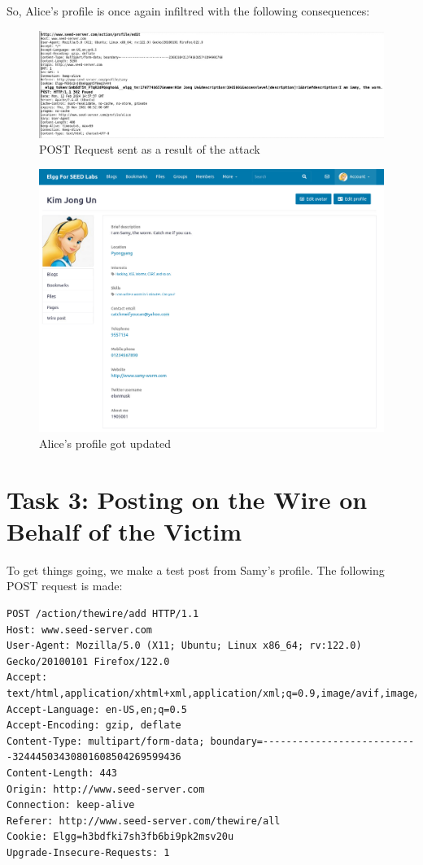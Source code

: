 \documentclass[12pt]{article}
\begin{document}
So, Alice's profile is once again infiltred with the following consequences:
     \begin{figure}[H]
         \centering
         \includegraphics[width=\textwidth]{Images/ss8.png}
         \caption{POST Request sent as a result of the attack}
         \label{fig:ss8}
     \end{figure}
     \begin{figure}[H]
         \centering
         \includegraphics[width=\textwidth]{Images/ss3.png}
         \caption{Alice's profile got updated}
         \label{fig:ss3}
     \end{figure}

\newpage


\section*{Task 3: Posting on the Wire on Behalf of the Victim}
To get things going, we make a test post from Samy's profile. The following POST request is made:

\begin{verbatim}
POST /action/thewire/add HTTP/1.1
Host: www.seed-server.com
User-Agent: Mozilla/5.0 (X11; Ubuntu; Linux x86_64; rv:122.0) Gecko/20100101 Firefox/122.0
Accept: text/html,application/xhtml+xml,application/xml;q=0.9,image/avif,image/webp,*/*;q=0.8
Accept-Language: en-US,en;q=0.5
Accept-Encoding: gzip, deflate
Content-Type: multipart/form-data; boundary=---------------------------32444503430801608504269599436
Content-Length: 443
Origin: http://www.seed-server.com
Connection: keep-alive
Referer: http://www.seed-server.com/thewire/all
Cookie: Elgg=h3bdfki7sh3fb6bi9pk2msv20u
Upgrade-Insecure-Requests: 1
\end{verbatim}
\end{document}
